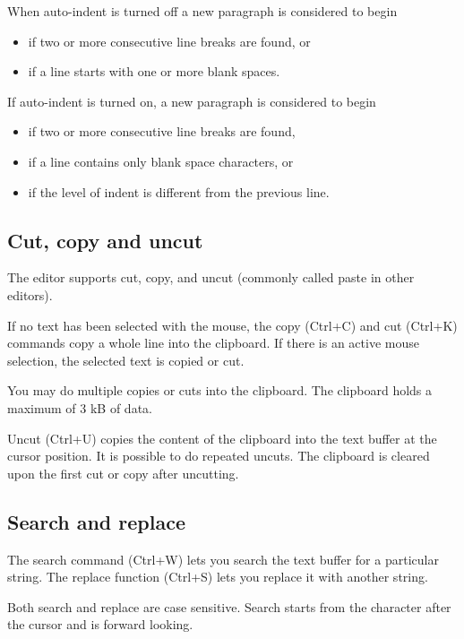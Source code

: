\documentclass{article}
\begin{document}
        When auto-indent is turned off a new paragraph is considered to begin

        \begin{itemize}
            \item if two or more consecutive line breaks are found, or
            \item if a line starts with one or more blank spaces.
        \end{itemize}

        If auto-indent is turned on, a new paragraph is considered to begin

        \begin{itemize}
            \item if two or more consecutive line breaks are found, 
            \item if a line contains only blank space characters, or
            \item if the level of indent is different from the previous line.
        \end{itemize}

    \subsection{Cut, copy and uncut}
        The editor supports cut, copy, and uncut (commonly called paste in other editors).

        If no text has been selected with the mouse, the copy (Ctrl+C) and cut (Ctrl+K) commands
        copy a whole line into the clipboard. If there is an active mouse selection, the selected
        text is copied or cut.

        You may do multiple copies or cuts into the clipboard. The clipboard holds a maximum of 3 kB of data.

        Uncut (Ctrl+U) copies the content of the clipboard into the text buffer at the cursor position. It is possible
        to do repeated uncuts. The clipboard is cleared upon the first cut or copy after uncutting.

    \subsection{Search and replace}
        The search command (Ctrl+W) lets you search the text buffer for
        a particular string. The replace function (Ctrl+S)
        lets you replace it with another string.

        Both search and replace are case sensitive. Search starts from the character after the cursor
        and is forward looking.
\end{document}
